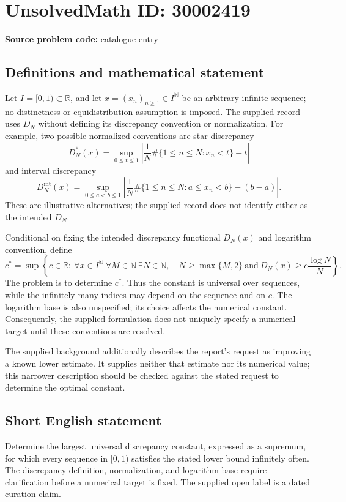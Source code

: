 \documentclass[11pt]{article}
\newcommand{\N}{\mathbb{N}}
\newcommand{\R}{\mathbb{R}}
\begin{document}
\section*{UnsolvedMath ID: 30002419}
\textbf{Source problem code:} catalogue entry
\subsection{Definitions and mathematical statement}
Let \(I=[0,1)\subset\R\), and let \(x=(x_n)_{n\geq1}\in I^{\N}\) be an arbitrary infinite sequence; no distinctness or equidistribution assumption is imposed. The supplied record uses \(D_N\) without defining its discrepancy convention or normalization. For example, two possible normalized conventions are star discrepancy
\[
D_N^*(x)=\sup_{0\leq t\leq1}\left|\frac1N\#\{1\leq n\leq N:x_n<t\}-t\right|
\]
and interval discrepancy
\[
D_N^{\mathrm{int}}(x)=\sup_{0\leq a<b\leq1}\left|\frac1N\#\{1\leq n\leq N:a\leq x_n<b\}-(b-a)\right|.
\]
These are illustrative alternatives; the supplied record does not identify either as the intended \(D_N\).

Conditional on fixing the intended discrepancy functional \(D_N(x)\) and logarithm convention, define
\[
c^*=\sup\left\{c\in\R:\ \forall x\in I^{\N}\ \forall M\in\N\ \exists N\in\N,\quad N\geq\max\{M,2\}\ \text{and}\ D_N(x)\geq c\frac{\log N}{N}\right\}.
\]
The problem is to determine \(c^*\). Thus the constant is universal over sequences, while the infinitely many indices may depend on the sequence and on \(c\). The logarithm base is also unspecified; its choice affects the numerical constant. Consequently, the supplied formulation does not uniquely specify a numerical target until these conventions are resolved.

The supplied background additionally describes the report's request as improving a known lower estimate. It supplies neither that estimate nor its numerical value; this narrower description should be checked against the stated request to determine the optimal constant.
\subsection{Short English statement}
Determine the largest universal discrepancy constant, expressed as a supremum, for which every sequence in \([0,1)\) satisfies the stated lower bound infinitely often. The discrepancy definition, normalization, and logarithm base require clarification before a numerical target is fixed. The supplied open label is a dated curation claim.
\end{document}
